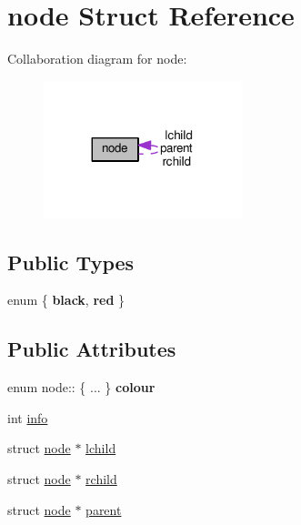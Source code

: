 \hypertarget{structnode}{\section{node Struct Reference}
\label{structnode}
}


Collaboration diagram for node\+:\nopagebreak
\begin{figure}[H]
\begin{center}
\leavevmode
\includegraphics[width=164pt]{structnode__coll__graph}
\end{center}
\end{figure}
\subsection*{Public Types}
\begin{DoxyCompactItemize}
\item 
\hypertarget{structnode_affe9650e53b0efaa6d69372b45d795bd}{enum \{ {\bfseries black}, 
{\bfseries red}
 \}}\label{structnode_affe9650e53b0efaa6d69372b45d795bd}

\end{DoxyCompactItemize}
\subsection*{Public Attributes}
\begin{DoxyCompactItemize}
\item 
\hypertarget{structnode_a883641a3dd856c38125e6a08db4e66af}{enum node\+:: \{ ... \}  {\bfseries colour}}\label{structnode_a883641a3dd856c38125e6a08db4e66af}

\item 
int \hyperlink{structnode_ac8973feda870a119ccdc25910254db0c}{info}
\item 
struct \hyperlink{structnode}{node} $\ast$ \hyperlink{structnode_a5e9a6db5c18bb131ca4b72a1ff575ad8}{lchild}
\item 
struct \hyperlink{structnode}{node} $\ast$ \hyperlink{structnode_aa1ed9628cfc90de6f68ff88ddf9350fa}{rchild}
\item 
struct \hyperlink{structnode}{node} $\ast$ \hyperlink{structnode_a05e4fe9e0177ba2d8dbd2c487cfddd53}{parent}
\end{DoxyCompactItemize}


